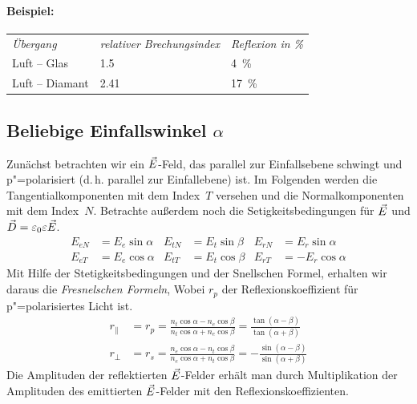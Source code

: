 \paragraph{Beispiel:}
\begin{center}
  \begin{tabular}{lll}
    \emph{Übergang} & \emph{relativer Brechungsindex} & \emph{Reflexion in \%}\\
    Luft -- Glas & \num{1.5} & \SI{4}{\percent} \\
    Luft -- Diamant & \num{2.41} & \SI{17}{\percent}
  \end{tabular}
\end{center}

\subsection[Beliebige Einfallswinkel]{Beliebige Einfallswinkel $\alpha$}
Zunächst betrachten wir ein $\vec{E}$-Feld, das parallel zur
Einfallsebene schwingt und p"=polarisiert (d.\,h. parallel zur Einfallebene)
ist. Im Folgenden werden die Tangentialkomponenten mit dem Index~$T$
versehen und die Normalkomponenten mit dem Index~$N$. Betrachte außerdem
noch die Setigkeitsbedingungen für $\vec{E}$ und
$\vec{D}=\varepsilon_0\varepsilon\vec{E}$.
\begin{align*}
  E_{eN} &= E_e\sin\alpha
  &E_{tN} &= E_t\sin\beta
  &E_{rN} &= E_r\sin\alpha\\
  E_{eT} &= E_e\cos\alpha
  &E_{tT} &= E_t\cos\beta
  &E_{rT} &= -E_r\cos\alpha
\end{align*}
Mit Hilfe der Stetigkeitsbedingungen und der Snellschen Formel,
erhalten wir daraus die 
\emph{Fresnelschen Formeln}, 
Wobei $r_p$ der Reflexionskoeffizient für p"=polarisiertes Licht ist. 
\begin{align}
  r_{\parallel} 
  &= r_p
    = \frac
    {n_t\cos\alpha - n_e\cos\beta}
    {n_t\cos\alpha + n_e\cos\beta}
    = \frac
    {\tan(\alpha - \beta)}
    {\tan(\alpha + \beta)}\label{FF1}\\
  r_{\bot}
  &=r_s
    = \frac
    {n_e\cos\alpha - n_t\cos\beta}
    {n_e\cos\alpha + n_t\cos\beta}
    = -\frac
    {\sin(\alpha - \beta)}
    {\sin(\alpha + \beta)}\label{FF2}
\end{align}
Die Amplituden der reflektierten $\vec{E}$-Felder erhält man durch
Multiplikation der Amplituden des emittierten $\vec{E}$-Felder mit den
Reflexionskoeffizienten.


